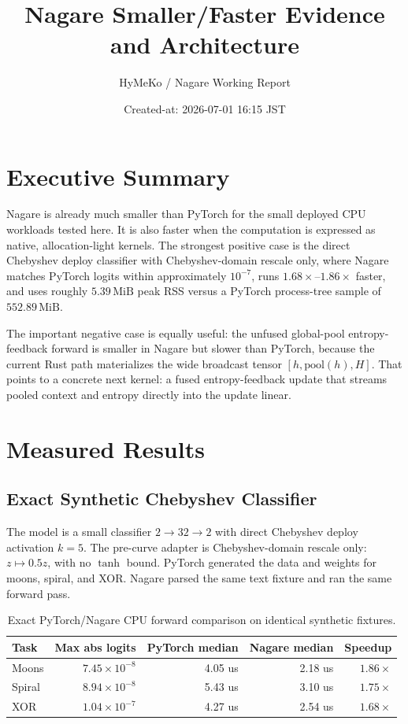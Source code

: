 \documentclass[11pt]{article}
\title{Nagare Smaller/Faster Evidence and Architecture}
\author{HyMeKo / Nagare Working Report}
\date{Created-at: 2026-07-01 16:15 JST}
\begin{document}
\maketitle

\section*{Executive Summary}

Nagare is already much smaller than PyTorch for the small deployed CPU workloads
tested here. It is also faster when the computation is expressed as native,
allocation-light kernels. The strongest positive case is the direct Chebyshev
deploy classifier with Chebyshev-domain rescale only, where Nagare matches
PyTorch logits within approximately
\(10^{-7}\), runs \(1.68\times\)--\(1.86\times\) faster, and uses roughly
\(5.39\,\mathrm{MiB}\) peak RSS versus a PyTorch process-tree sample of
\(552.89\,\mathrm{MiB}\).

The important negative case is equally useful: the unfused global-pool
entropy-feedback forward is smaller in Nagare but slower than PyTorch, because
the current Rust path materializes the wide broadcast tensor
\([h,\mathrm{pool}(h),H]\). That points to a concrete next kernel:
a fused entropy-feedback update that streams pooled context and entropy directly
into the update linear.

\section{Measured Results}

\subsection{Exact Synthetic Chebyshev Classifier}

The model is a small classifier \(2 \rightarrow 32 \rightarrow 2\) with direct
Chebyshev deploy activation \(k=5\). The pre-curve adapter is Chebyshev-domain
rescale only: \(z \mapsto 0.5z\), with no \(\tanh\) bound. PyTorch generated
the data and weights for moons, spiral, and XOR. Nagare parsed the same text
fixture and ran the same forward pass.

\begin{table}[h]
\centering
\begin{tabular}{lrrrr}
\toprule
Task & Max abs logits & PyTorch median & Nagare median & Speedup \\
\midrule
Moons  & \(7.45\times 10^{-8}\) & 4.05 us & 2.18 us & \(1.86\times\) \\
Spiral & \(8.94\times 10^{-8}\) & 5.43 us & 3.10 us & \(1.75\times\) \\
XOR    & \(1.04\times 10^{-7}\) & 4.27 us & 2.54 us & \(1.68\times\) \\
\bottomrule
\end{tabular}
\caption{Exact PyTorch/Nagare CPU forward comparison on identical synthetic fixtures.}
\end{table}
\end{document}
